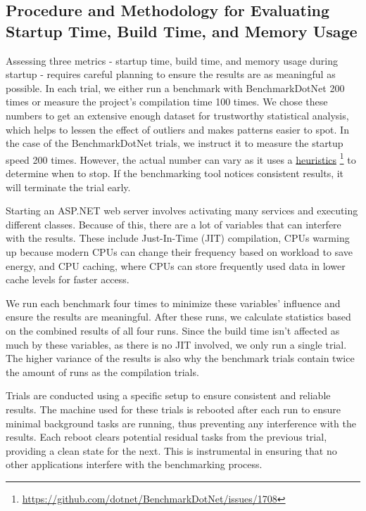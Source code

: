 \subsection{Procedure and Methodology for Evaluating Startup Time, Build Time, and Memory Usage}

Assessing three metrics - startup time, build time, and memory usage during startup - requires careful planning to ensure the results are as meaningful as possible. In each trial, we either run a benchmark with BenchmarkDotNet 200 times or measure the project's compilation time 100 times. We chose these numbers to get an extensive enough dataset for trustworthy statistical analysis, which helps to lessen the effect of outliers and makes patterns easier to spot. In the case of the BenchmarkDotNet trials, we instruct it to measure the startup speed 200 times. However, the actual number can vary as it uses a \href{https://github.com/dotnet/BenchmarkDotNet/issues/1708}{heuristics} \footnote{\url{https://github.com/dotnet/BenchmarkDotNet/issues/1708}} to determine when to stop. If the benchmarking tool notices consistent results, it will terminate the trial early.

Starting an ASP.NET web server involves activating many services and executing different classes. Because of this, there are a lot of variables that can interfere with the results. These include Just-In-Time (JIT) compilation, CPUs warming up because modern CPUs can change their frequency based on workload to save energy, and CPU caching, where CPUs can store frequently used data in lower cache levels for faster access.

We run each benchmark four times to minimize these variables' influence and ensure the results are meaningful. After these runs, we calculate statistics based on the combined results of all four runs. Since the build time isn't affected as much by these variables, as there is no JIT involved, we only run a single trial. The higher variance of the results is also why the benchmark trials contain twice the amount of runs as the compilation trials.

Trials are conducted using a specific setup to ensure consistent and reliable results. The machine used for these trials is rebooted after each run to ensure minimal background tasks are running, thus preventing any interference with the results. Each reboot clears potential residual tasks from the previous trial, providing a clean state for the next. This is instrumental in ensuring that no other applications interfere with the benchmarking process.

